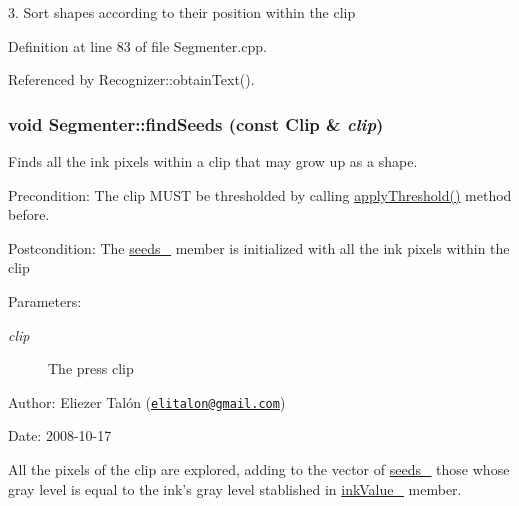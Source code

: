3. Sort shapes according to their position within the clip 

Definition at line 83 of file Segmenter.cpp.

Referenced by Recognizer::obtainText().\hypertarget{class_segmenter_bacab187b543a51c5322c01fc0a29ffb}{
\subsubsection[findSeeds]{\setlength{\rightskip}{0pt plus 5cm}void Segmenter::findSeeds (const {\bf Clip} \& {\em clip})}}
\label{class_segmenter_bacab187b543a51c5322c01fc0a29ffb}


Finds all the ink pixels within a clip that may grow up as a shape. 

\begin{Desc}
\item[Precondition:]The clip MUST be thresholded by calling \hyperlink{class_segmenter_6854315e3320f9d9a8ece14cbb8570ee}{applyThreshold()} method before.\end{Desc}
\begin{Desc}
\item[Postcondition:]The \hyperlink{class_segmenter_48b7c2c842b26bebda9d0fc13cf81e58}{seeds\_\-} member is initialized with all the ink pixels within the clip\end{Desc}
\begin{Desc}
\item[Parameters:]
\begin{description}
\item[{\em clip}]The press clip\end{description}
\end{Desc}
\begin{Desc}
\item[Author:]Eliezer Talón (\href{mailto:elitalon@gmail.com}{\tt elitalon@gmail.com}) \end{Desc}
\begin{Desc}
\item[Date:]2008-10-17\end{Desc}
All the pixels of the clip are explored, adding to the vector of \hyperlink{class_segmenter_48b7c2c842b26bebda9d0fc13cf81e58}{seeds\_\-} those whose gray level is equal to the ink's gray level stablished in \hyperlink{class_segmenter_fa6183f99aa6011399783652b341a43b}{inkValue\_\-} member. 

